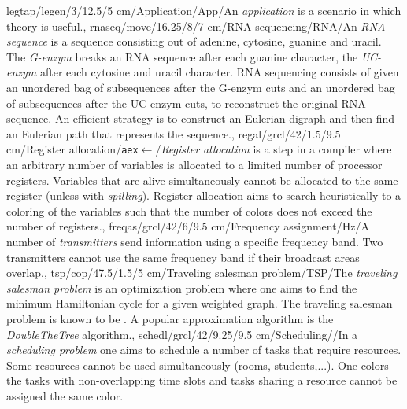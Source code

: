legtap/legen/3/12.5/5 cm/Application/App/{An \emph{application} is a scenario in which theory is useful.},
rnaseq/move/16.25/8/7 cm/{RNA sequencing}/{RNA}/{An \emph{RNA sequence} is a sequence consisting out of adenine, cytosine, guanine and uracil. The \emph{G-enzym} breaks an RNA sequence after each guanine character, the \emph{UC-enzym} after each cytosine and uracil character. RNA sequencing consists of given an unordered bag of subsequences after the G-enzym cuts and an unordered bag of subsequences after the UC-enzym cuts, to reconstruct the original RNA sequence. An efficient strategy is to construct an Eulerian digraph and then find an Eulerian path that represents the sequence.},
regal/grcl/42/1.5/9.5 cm/{Register allocation}/{\texttt{aex}$\gets$}/{\emph{Register allocation} is a step in a compiler where an arbitrary number of variables is allocated to a limited number of processor registers. Variables that are alive simultaneously cannot be allocated to the same register (unless with \emph{spilling}). Register allocation aims to search heuristically to a coloring of the variables such that the number of colors does not exceed the number of registers.},
freqas/grcl/42/6/9.5 cm/{Frequency assignment}/{Hz}/{A number of \emph{transmitters} send information using a specific frequency band. Two transmitters cannot use the same frequency band if their broadcast areas overlap.},
tsp/cop/47.5/1.5/5 cm/{Traveling salesman problem}/{TSP}/{The \emph{traveling salesman problem} is an optimization problem where one aims to find the minimum Hamiltonian cycle for a given weighted graph. The traveling salesman problem is known to be \ccnph{}. A popular approximation algorithm is the \emph{DoubleTheTree} algorithm.},
schedl/grcl/42/9.25/9.5 cm/{Scheduling}/{\clock}/{In a \emph{scheduling problem} one aims to schedule a number of tasks that require resources. Some resources cannot be used simultaneously (rooms, students,...). One colors the tasks with non-overlapping time slots and tasks sharing a resource cannot be assigned the same color.}